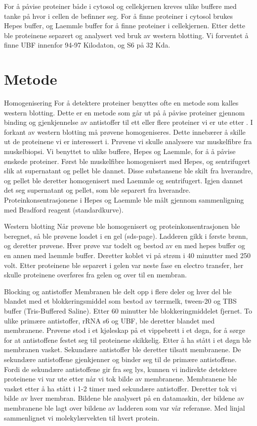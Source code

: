 \documentclass[
]{book}
\begin{document}
For å påvise proteiner både i cytosol og cellekjernen kreves ulike buffere med tanke på hvor i cellen de befinner seg. For å finne proteiner i cytosol brukes Hepes buffer, og Laemmle buffer for å finne proteiner i cellekjernen. Etter dette ble proteinene separert og analysert ved bruk av western blotting. Vi forventet å finne UBF innenfor 94-97 Kilodaton, og S6 på 32 Kda.

\hypertarget{metode}{%
\section{Metode}\label{metode}}

Homogenisering For å detektere proteiner benyttes ofte en metode som kalles western blotting. Dette er en metode som går ut på å påvise proteiner gjennom binding og gjenkjennelse av antistoffer til ett eller flere proteiner vi er ute etter \citep{bass2017}. I forkant av western blotting må prøvene homogeniseres. Dette innebærer å skille ut de proteinene vi er interessert i. Prøvene vi skulle analysere var muskelfibre fra muskelbiopsi. Vi benyttet to ulike buffere, Hepes og Laemmle, for å å påvise ønskede proteiner. Først ble muskelfibre homogenisert med Hepes, og sentrifugert slik at supernatant og pellet ble dannet. Disse substansene ble skilt fra hverandre, og pellet ble deretter homogenisert med Laemmle og sentrifugert. Igjen dannet det seg supernatant og pellet, som ble separert fra hverandre. Proteinkonsentrasjonene i Hepes og Laemmle ble målt gjennom sammenligning med Bradford reagent (standardkurve).

Western blotting Når prøvene ble homogenisert og proteinkonsentrasjonen ble beregnet, så ble prøvene loadet i en gel (sds-page). Ladderen gikk i første brønn, og deretter prøvene. Hver prøve var todelt og bestod av en med hepes buffer og en annen med laemmle buffer. Deretter koblet vi på strøm i 40 minutter med 250 volt. Etter proteinene ble separert i gelen var neste fase en electro transfer, her skulle proteinene overføres fra gelen og over til en membran.

Blocking og antistoffer Membranen ble delt opp i flere deler og hver del ble blandet med et blokkeringsmiddel som bestod av tørrmelk, tween-20 og TBS buffer (Tris-Buffered Saline). Etter 60 minutter ble blokkeringmiddelet fjernet. To ulike primære antistoffer, rRNA s6 og UBF, ble deretter blandet med membranene. Prøvene stod i et kjøleskap på et vippebrett i et døgn, for å sørge for at antistoffene festet seg til proteinene skikkelig. Etter å ha stått i et døgn ble membranen vasket. Sekundære antistoffer ble deretter tilsatt membranene. De sekundære antistoffene gjenkjenner og binder seg til de primære antistoffene. Fordi de sekundære antistoffene gir fra seg lys, kunnen vi indirekte detektere proteinene vi var ute etter når vi tok bilde av membranene. Membranene ble vasket etter å ha stått i 1-2 timer med sekundære antistoffer. Deretter tok vi bilde av hver membran. Bildene ble analysert på en datamaskin, der bildene av membranene ble lagt over bildene av ladderen som var vår referanse. Med linjal sammenlignet vi molekylærvekten til hvert protein.
\end{document}
